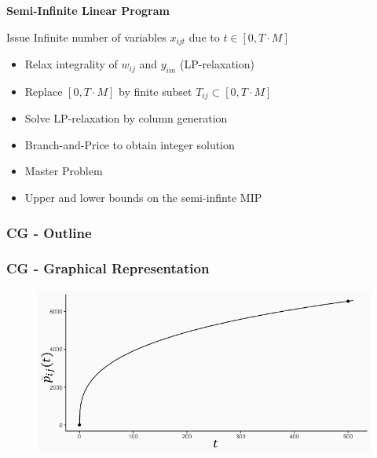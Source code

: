 \begin{frame}{\textbf{Semi-Infinite Linear Program}}
\begin{block}{Issue}
Infinite number of variables $x_{ijt}$ due to $t \in \left[ 0,T \cdot M \right]$
\end{block}
\bigskip
{}
\begin{itemize}
  \item<2-> Relax integrality of $w_{ij}$ and $y_{im}$ (LP-relaxation)
  \item<3-> Replace $[0,T \cdot M]$ by finite subset $T_{ij} \subset [0,T \cdot M]$  
	\item<4-> Solve LP-relaxation by column generation
	\item<5-> Branch-and-Price to obtain integer solution
\end{itemize}
\vfill
{}
\begin{itemize}
  \item<2->  Master Problem
  \item<5-> Upper and lower bounds on the semi-infinte MIP
\end{itemize}
\end{frame}

\begin{frame}
\frametitle{CG - Outline}
\begin{center}
\scalebox{0.55}{

}
\end{center}
\end{frame}

\begin{frame}
\frametitle{CG - Graphical Representation}
\begin{center}
\begin{figure}
    \centering
    \includegraphics[width=\linewidth]{plot1.png}
\end{figure}
\end{center}
\end{frame}

